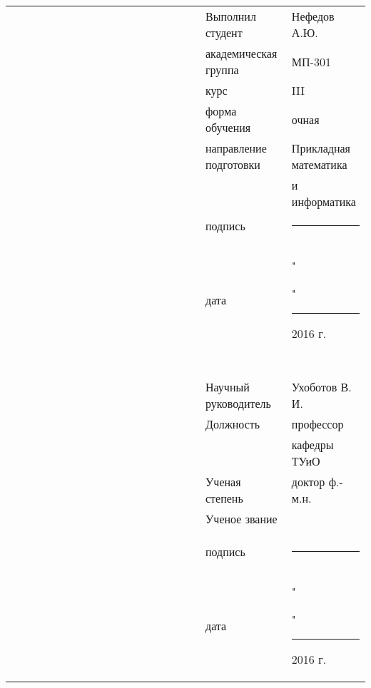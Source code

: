 \documentclass[12pt,a4paper,titlepage]{article}
\begin{document}
\begin{titlepage}
\begin{center}
{\footnotesize
\begin{tabular}[t]{lllllllllllllllllll}
& & & & & & & & & & & & & & & & &   Выполнил студент       &   Нефедов А.Ю.   \\
& & & & & & & & & & & & & & & & &   академическая группа   &   МП-301        \\
& & & & & & & & & & & & & & & & &   курс                   &   III            \\
& & & & & & & & & & & & & & & & &   форма обучения         &   очная         \\
& & & & & & & & & & & & & & & & &   направление подготовки &   Прикладная математика    \\
& & & & & & & & & & & & & & & & &                          &    и информатика              \\
& & & & & & & & & & & & & & & & &   подпись                &   \rule{3.3cm}{0.01cm}\\
& & & & & & & & & & & & & & & & &                          &                 \\
& & & & & & & & & & & & & & & & &   дата                   &   "\rule{0,7cm}{0.01cm}"\rule{1cm}{0.01cm} 2016 г.\\
& & & & & & & & & & & & & & & & &                          &                 \\
& & & & & & & & & & & & & & & & &                          &                 \\
& & & & & & & & & & & & & & & & &                          &                 \\
& & & & & & & & & & & & & & & & &                          &                 \\
& & & & & & & & & & & & & & & & &                          &                 \\
& & & & & & & & & & & & & & & & &   Научный руководитель   &   Ухоботов В. И.\\
& & & & & & & & & & & & & & & & &   Должность              &   профессор     \\
& & & & & & & & & & & & & & & & &                          &   кафедры ТУиО  \\
& & & & & & & & & & & & & & & & &   Ученая степень         &   доктор ф.-м.н.\\
& & & & & & & & & & & & & & & & &   Ученое звание          &                 \\
& & & & & & & & & & & & & & & & &                          &                 \\
& & & & & & & & & & & & & & & & &                          &                 \\
& & & & & & & & & & & & & & & & &   подпись                &  \rule{3.3cm}{0.01cm}\\
& & & & & & & & & & & & & & & & &                          &                 \\
& & & & & & & & & & & & & & & & &   дата                   &  "\rule{0,7cm}{0.01cm}"\rule{1cm}{0.01cm} 2016 г.     \\


\end{tabular}}
\end{center}
\end{titlepage}
\end{document}
